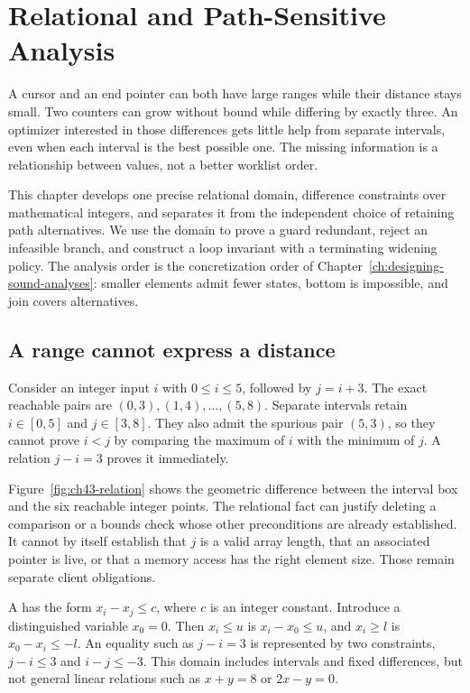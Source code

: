 \chapter{Relational and Path-Sensitive Analysis}
\label{ch:relational-path-analysis}

A cursor and an end pointer can both have large ranges while their distance stays small.
Two counters can grow without bound while differing by exactly three.
An optimizer interested in those differences gets little help from separate intervals, even when each interval is the best possible one.
The missing information is a relationship between values, not a better worklist order.

This chapter develops one precise relational domain, difference constraints over mathematical integers, and separates it from the independent choice of retaining path alternatives.
We use the domain to prove a guard redundant, reject an infeasible branch, and construct a loop invariant with a terminating widening policy.
The analysis order is the concretization order of Chapter~\ref{ch:designing-sound-analyses}: smaller elements admit fewer states, bottom is impossible, and join covers alternatives.

\section{A range cannot express a distance}
\label{sec:ch43-distance}

Consider an integer input $i$ with $0\leq i\leq5$, followed by $j=i+3$.
The exact reachable pairs are $(0,3),(1,4),\ldots,(5,8)$.
Separate intervals retain $i\in[0,5]$ and $j\in[3,8]$.
They also admit the spurious pair $(5,3)$, so they cannot prove $i<j$ by comparing the maximum of $i$ with the minimum of $j$.
A relation $j-i=3$ proves it immediately.

Figure~\ref{fig:ch43-relation} shows the geometric difference between the interval box and the six reachable integer points.
The relational fact can justify deleting a comparison or a bounds check whose other preconditions are already established.
It cannot by itself establish that $j$ is a valid array length, that an associated pointer is live, or that a memory access has the right element size.
Those remain separate client obligations.



A  has the form $x_i-x_j\leq c$, where $c$ is an integer constant.
Introduce a distinguished variable $x_0=0$.
Then $x_i\leq u$ is $x_i-x_0\leq u$, and $x_i\geq l$ is $x_0-x_i\leq-l$.
An equality such as $j-i=3$ is represented by two constraints, $j-i\leq3$ and $i-j\leq-3$.
This domain includes intervals and fixed differences, but not general linear relations such as $x+y=8$ or $2x-y=0$.

